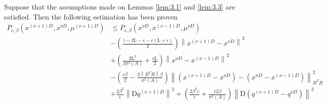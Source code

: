     \begin{lemma}\label{lem:3.4}
        Suppose that the assumptions made on Lemmas \ref{lem:3.1} and \ref{lem:3.3} are satisfied. Then the following estimation has been proven
        \begin{equation}\label{eq:3.2.17}
            \begin{align}
                P_{c, \beta} \left(x^{(\nu + 1)D}, x^{\nu D}, \mu^{(\nu + 1)D}\right) & \leq  P_{c, \beta} \left(x^{\nu D}, x^{(\nu - 1)D}, \mu^{\nu D}\right) \\
                &- \left(\frac{\gamma - 2\mathrm{L} - \epsilon - c(\mathrm{L} + \epsilon)}{2}\right) \left \lVert x^{(\nu + 1)D} - x^{\nu D}\right\rVert^2\\
                &+ \left( \frac{3\mathrm{L}^2}{\beta \underline{\sigma}^2(A)} + \frac{c\mathrm{L}}{2}\right) \left \lVert x^{\nu D} - x^{(\nu - 1)D}\right\rVert^2\\
                &-\left(\frac{c\beta}{2} - \frac{3\left\lVert B^TB \right \rVert \beta}{\underline{\sigma}^2(A)}\right)\left \lVert \left(x^{(\nu + 1)D} -x^{\nu D}\right) - \left( x^{\nu D} - x^{(\nu - 1)D} \right)  \right \rVert^2_{B^TB}\\
                &+ \frac{2\beta^2}{\epsilon}\left \lVert \mathrm{D} q^{(\nu + 1)D}\right \rVert^2 + \left(\frac{2\beta^2 c}{\epsilon} + \frac{12\beta}{\underline{\sigma}^2(A)}\right) \left \lVert \mathrm{D}( q^{(\nu + 1)D} - q^{\nu D})\right \rVert^2
            \end{align}
        \end{equation}
    \end{lemma}
